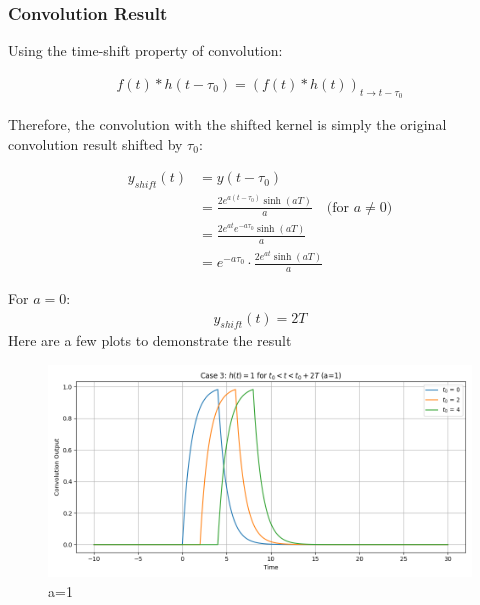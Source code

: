 \subsubsection{Convolution Result}
Using the time-shift property of convolution:

\begin{align}
f(t) * h(t-\tau_0) = (f(t) * h(t))_{t \rightarrow t-\tau_0}
\end{align}

Therefore, the convolution with the shifted kernel is simply the original convolution result shifted by $\tau_0$:

\begin{align}
y_{shift}(t) &= y(t-\tau_0) \\
&= \frac{2e^{a(t-\tau_0)}\sinh(aT)}{a} \quad \text{(for $a \neq 0$)} \\
&= \frac{2e^{at}e^{-a\tau_0}\sinh(aT)}{a} \\
&= e^{-a\tau_0} \cdot \frac{2e^{at}\sinh(aT)}{a}
\end{align}

For $a = 0$:
\begin{align}
y_{shift}(t) = 2T
\end{align}
Here are a few plots to demonstrate the result
\begin{figure}[H]
    \centering
    { 
    }
\end{figure}
\begin{figure}[H]
    \centering
    \includegraphics[width=0.7\linewidth]{codes/codes_exp/plotseax/case3a=1.png}
    \caption{a=1}
    \label{fig:enter-label}
\end{figure}
